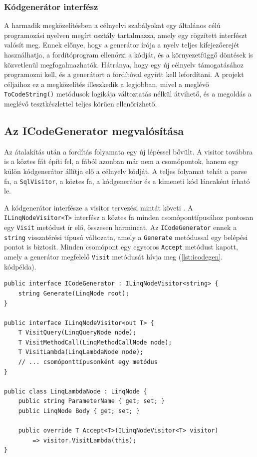 \documentclass[a4paper,12pt]{article}
\begin{document}
\subsubsection{Kódgenerátor interfész}

A harmadik megközelítésben a célnyelvi szabályokat egy általános célú programozási nyelven megírt osztály tartalmazza, amely egy rögzített interfészt valósít meg. Ennek előnye, hogy a generátor írója a nyelv teljes kifejezőerejét használhatja, a fordítóprogram ellenőrzi a kódját, és a környezetfüggő döntések is közvetlenül megfogalmazhatók. Hátránya, hogy egy új célnyelv támogatásához programozni kell, és a generátort a fordítóval együtt kell lefordítani. A projekt céljaihoz ez a megközelítés illeszkedik a legjobban, mivel a meglévő \texttt{ToCodeString()} metódusok logikája változtatás nélkül átvihető, és a megoldás a meglévő tesztkészlettel teljes körűen ellenőrizhető.

\subsection{Az ICodeGenerator megvalósítása}

Az átalakítás után a fordítás folyamata egy új lépéssel bővült. A visitor továbbra is a köztes fát építi fel, a fából azonban már nem a csomópontok, hanem egy külön kódgenerátor állítja elő a célnyelv kódját. A teljes folyamat tehát a parse fa, a \texttt{SqlVisitor}, a köztes fa, a kódgenerátor és a kimeneti kód láncaként írható le.

A kódgenerátor interfésze a visitor tervezési mintát követi \cite{gamma1994design}. A \\\texttt{ILinqNodeVisitor<T>} interfész a köztes fa minden csomóponttípusához pontosan egy \texttt{Visit} metódust ír elő, összesen harmincat. Az \texttt{ICodeGenerator} ennek a \texttt{string} visszatérési típusú változata, amely a \texttt{Generate} metódussal egy belépési pontot is biztosít. Minden csomópont egy egysoros \texttt{Accept} metódust kapott, amely a generátor megfelelő \texttt{Visit} metódusát hívja meg (\ref{lst:icodegen}. kódpélda).

\newpage

\begin{lstlisting}[caption={A kódgenerátor interfésze és egy csomópont Accept metódusa}, label={lst:icodegen}]
public interface ICodeGenerator : ILinqNodeVisitor<string> {
    string Generate(LinqNode root);
}

public interface ILinqNodeVisitor<out T> {
    T VisitQuery(LinqQueryNode node);
    T VisitMethodCall(LinqMethodCallNode node);
    T VisitLambda(LinqLambdaNode node);
    // ... csomóponttípusonként egy metódus
}

public class LinqLambdaNode : LinqNode {
    public string ParameterName { get; set; }
    public LinqNode Body { get; set; }

    public override T Accept<T>(ILinqNodeVisitor<T> visitor)
        => visitor.VisitLambda(this);
}
\end{lstlisting}
\end{document}

